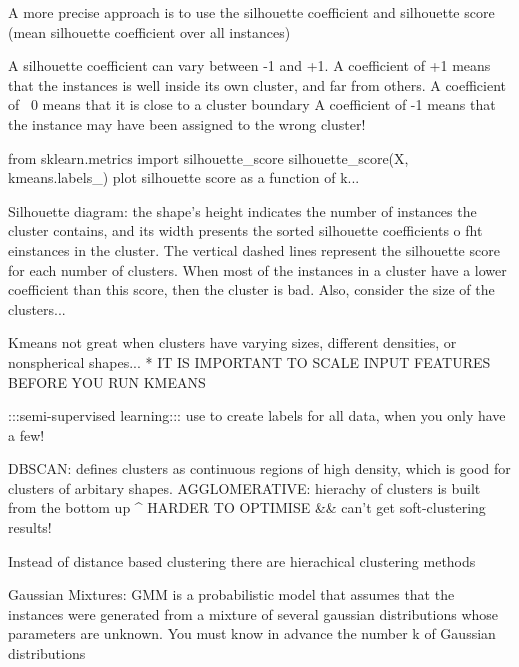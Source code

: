 A more precise approach is to use the silhouette coefficient
and silhouette score (mean silhouette coefficient over all instances)

A silhouette coefficient can vary between -1 and +1.
A coefficient of +1 means that the instances is well inside its own cluster, and far from others.
A coefficient of ~0 means that it is close to a cluster boundary
A coefficient of -1 means that the instance may have been assigned to the wrong cluster!

from sklearn.metrics import silhouette_score
silhouette_score(X, kmeans.labels_)
plot silhouette score as a function of k...

Silhouette diagram:
the shape's height indicates the number of instances
the cluster contains, and its width presents the sorted silhouette coefficients o fht einstances in the cluster.
The vertical dashed lines represent the silhouette score for each number of clusters.
When most of the instances in a cluster have a lower coefficient than this score,
then the cluster is bad.
Also, consider the size of the clusters...

Kmeans not great when clusters have varying sizes,
different densities,
or nonspherical shapes...
* IT IS IMPORTANT TO SCALE INPUT FEATURES BEFORE YOU RUN KMEANS

:::semi-supervised learning:::
use to create labels for all data, when you only have a few!

DBSCAN: defines clusters as continuous regions of high density, which is good for clusters of arbitary shapes.
AGGLOMERATIVE: hierachy of clusters is built from the bottom up
^ HARDER TO OPTIMISE
&& can't get soft-clustering results!

Instead of distance based clustering
there are hierachical clustering methods


Gaussian Mixtures:
GMM is a probabilistic model that assumes that the instances were generated from a mixture of several gaussian distributions
whose parameters are unknown.
You must know in advance the number k of Gaussian distributions

